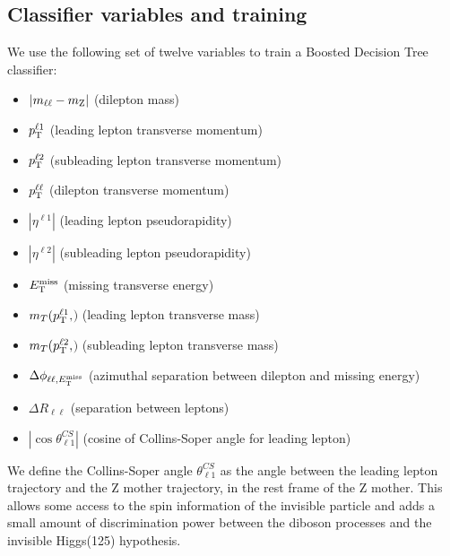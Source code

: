 \subsection{Classifier variables and training} 

We use the following set of twelve variables to train a Boosted Decision Tree classifier: 
\begin{itemize}
\item  $\left|m_{\ell\ell}-m_{\mathrm{Z}}\right|$ (dilepton mass) 
\item $p_{\mathrm{T}}^{\ell 1}$ (leading lepton transverse momentum) 
\item $p_{\mathrm{T}}^{\ell 2}$ (subleading lepton transverse momentum)
\item $p_{\mathrm{T}}^{\ell\ell}$ (dilepton transverse momentum)
\item $| \eta^{\ell 1} |$ (leading lepton pseudorapidity)
\item $| \eta^{\ell 2} |$ (subleading lepton pseudorapidity)
\item $E_\mathrm{T}^{\mathrm{miss}}$       (missing transverse energy)
\item $m_{T}(p_{\mathrm{T}}^{\ell 1}, $\met$)$ (leading lepton transverse mass)
\item $m_{T}(p_{\mathrm{T}}^{\ell 2}, $\met$)$ (subleading lepton transverse mass)
\item $\Delta \phi_{\ell\ell,E_\mathrm{T}^{\mathrm{miss}}}$ (azimuthal separation between dilepton and missing energy) 
\item $\Delta R_{\ell\ell}$ (separation between leptons)
\item $| \cos \theta^{CS}_{\ell1} |$ (cosine of Collins-Soper angle for leading lepton)
\end{itemize}

We define the Collins-Soper angle $\theta^{CS}_{\ell1}$ as the angle between the leading lepton trajectory and the Z mother trajectory, in the rest frame of the Z mother. This allows some access to the spin information of the invisible particle and adds a small amount of discrimination power between the diboson processes and the invisible Higgs(125) hypothesis.

